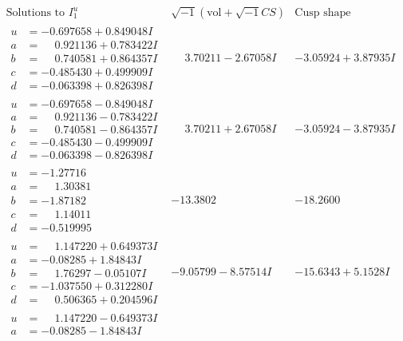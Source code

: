 \documentclass[1p]{elsarticle_modified}
\theoremstyle{definition}
\newcommand{\I}{\sqrt{-1}}
\begin{document}
$$\begin{array}{c|c|c}  
\text{Solutions to }I^u_{1}& \I (\text{vol} + \sqrt{-1}CS) & \text{Cusp shape}\\
 \hline 
\begin{aligned}
u &= -0.697658 + 0.849048 I \\
a &= \phantom{-}0.921136 + 0.783422 I \\
b &= \phantom{-}0.740581 + 0.864357 I \\
c &= -0.485430 + 0.499909 I \\
d &= -0.063398 + 0.826398 I\end{aligned}
 & \phantom{-}3.70211 - 2.67058 I & -3.05924 + 3.87935 I \\ \hline\begin{aligned}
u &= -0.697658 - 0.849048 I \\
a &= \phantom{-}0.921136 - 0.783422 I \\
b &= \phantom{-}0.740581 - 0.864357 I \\
c &= -0.485430 - 0.499909 I \\
d &= -0.063398 - 0.826398 I\end{aligned}
 & \phantom{-}3.70211 + 2.67058 I & -3.05924 - 3.87935 I \\ \hline\begin{aligned}
u &= -1.27716\phantom{ +0.000000I} \\
a &= \phantom{-}1.30381\phantom{ +0.000000I} \\
b &= -1.87182\phantom{ +0.000000I} \\
c &= \phantom{-}1.14011\phantom{ +0.000000I} \\
d &= -0.519995\phantom{ +0.000000I}\end{aligned}
 & -13.3802\phantom{ +0.000000I} & -18.2600\phantom{ +0.000000I} \\ \hline\begin{aligned}
u &= \phantom{-}1.147220 + 0.649373 I \\
a &= -0.08285 + 1.84843 I \\
b &= \phantom{-}1.76297 - 0.05107 I \\
c &= -1.037550 + 0.312280 I \\
d &= \phantom{-}0.506365 + 0.204596 I\end{aligned}
 & -9.05799 - 8.57514 I & -15.6343 + 5.1528 I \\ \hline\begin{aligned}
u &= \phantom{-}1.147220 - 0.649373 I \\
a &= -0.08285 - 1.84843 I \\

\end{aligned}
\end{array}$$
\end{document}

